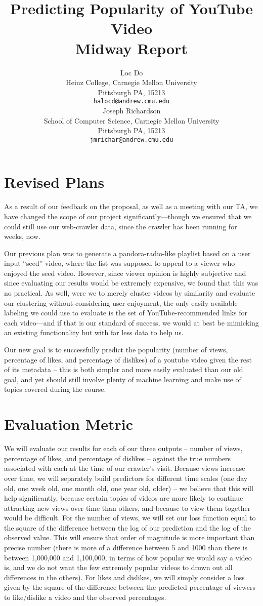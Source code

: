 \documentclass{article} %
\title{Predicting Popularity of YouTube Video\\
Midway Report}
\author{
Loc Do \\
Heinz College,
Carnegie Mellon University \\
Pittsburgh PA, 15213\\
\texttt{halocd@andrew.cmu.edu} \\
\And
Joseph Richardson \\
School of Computer Science,
Carnegie Mellon University \\
Pittsburgh PA, 15213 \\
\texttt{jmrichar@andrew.cmu.edu} \\
}
\begin{document}
\maketitle

\section{Revised Plans}

As a result of our feedback on the proposal, as well as a meeting with our TA, we have changed the scope of our project significantly—though we ensured that we could still use our web-crawler data, since the crawler has been running for weeks, now.

Our previous plan was to generate a pandora-radio-like playlist based on a user input “seed” video, where the list was supposed to appeal to a viewer who enjoyed the seed video.  However, since viewer opinion is highly subjective and since evaluating our results would be extremely expensive, we found that this was no practical.  As well, were we to merely cluster videos by similarity and evaluate our clustering without considering user enjoyment, the only easily available labeling we could use to evaluate is the set of YouTube-recommended links for each video—and if that is our standard of success, we would at best be mimicking an existing functionality but with far less data to help us.

Our new goal is to successfully predict the popularity (number of views, percentage of likes, and percentage of dislikes) of a youtube video given the rest of its metadata – this is both simpler and more easily evaluated than our old goal, and yet should still involve plenty of machine learning and make use of topics covered during the course.

\section{Evaluation Metric}

We will evaluate our results for each of our three outputs – number of views, percentage of likes, and percentage of dislikes – against the true numbers associated with each at the time of our crawler's visit.  Because views increase over time, we will separately build predictors for different time scales (one day old, one week old, one month old, one year old, older) – we believe that this will help significantly, because certain topics of videos are more likely to continue attracting new views over time than others, and because to view them together would be difficult.  For the number of views, we will set our loss function equal to the square of the difference between the log of our prediction and the log of the observed value.  This will ensure that order of magnitude is more important than precise number (there is more of a difference between 5 and 1000 than there is between 1,000,000 and 1,100,000, in terms of how popular we would say a video is, and we do not want the few extremely popular videos to drown out all differences in the others).  For likes and dislikes, we will simply consider a loss given by the square of the difference between the predicted percentage of viewers to like/dislike a video and the observed percentages.
\end{document}
